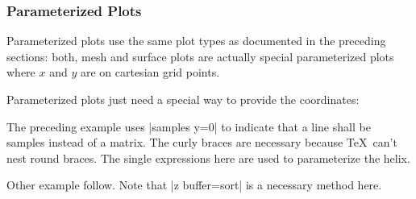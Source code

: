 \subsubsection{Parameterized Plots}
Parameterized plots use the same plot types as documented in the preceding sections: both, mesh and surface plots are actually special parameterized plots where $x$ and $y$ are on cartesian grid points.

Parameterized plots just need a special way to provide the coordinates:

\begin{codeexample}[]
\end{codeexample}
\noindent The preceding example uses |samples y=0| to indicate that a line shall be samples instead of a matrix. The curly braces are necessary because \TeX\ can't nest round braces. The single expressions here are used to parameterize the helix.

Other example follow. Note that |z buffer=sort| is a necessary method here.

\pgfplotsexpensiveexample
\begin{codeexample}[]
\end{codeexample}

\pgfplotsexpensiveexample
\begin{codeexample}[]
\end{codeexample}

\pgfplotsexpensiveexample
\begin{codeexample}[]
\end{codeexample}



